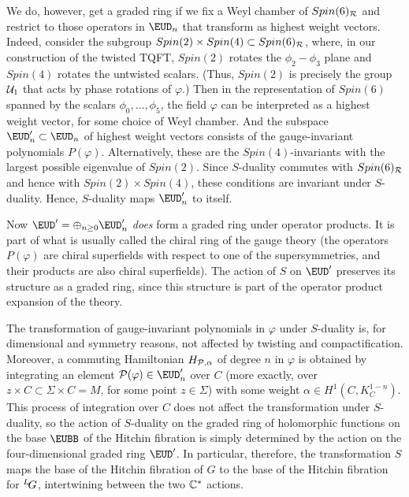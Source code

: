 We do, however, get a graded ring if we fix a Weyl chamber of
$Spin(6)_{\cal R}$  and restrict to those operators in ${\EUD}_n$
that transform as highest weight vectors. Indeed, consider the
subgroup $Spin(2)\times Spin(4)\subset Spin(6)_{{\cal R}}$, where,
in our construction of the twisted TQFT,  $Spin(2)$ rotates the
$\phi_2-\phi_3$ plane and $Spin(4)$ rotates the untwisted scalars.
(Thus, $Spin(2)$ is precisely the group ${\cal U}_1$ that acts by
phase rotations of $\varphi$.)   Then in the representation of
$Spin(6)$ spanned by the scalars $\phi_0,\dots,\phi_5$, the field
$\varphi$ can be interpreted as a highest weight vector, for some
choice of Weyl chamber. And the subspace ${\EUD}'_n\subset
{\EUD}_n$ of highest weight vectors consists of the
gauge-invariant polynomials $P(\varphi)$. Alternatively, these are
the $Spin(4)$-invariants with the largest possible eigenvalue of
$Spin(2)$.  Since $S$-duality commutes with $Spin(6)_{\cal R}$ and
hence with $Spin(2)\times Spin(4)$, these conditions are invariant
under $S$-duality.   Hence, $S$-duality maps ${\EUD}'_n$ to
itself.

Now ${\EUD}'=\oplus_{n\geq 0}{\EUD}'_n$ {\it does} form a graded
ring under operator products.  It is part of what is usually
called the chiral ring of the gauge theory (the operators
$P(\varphi)$ are chiral superfields with respect to one of the
supersymmetries, and their products are also chiral superfields).
The action of $S$ on ${\EUD}'$ preserves its structure as a graded
ring, since this structure is part of the operator product
expansion of the theory.

 The transformation of gauge-invariant polynomials in $\varphi$
under $S$-duality is, for dimensional and symmetry reasons, not
affected by twisting and compactification.  Moreover, a commuting
Hamiltonian $H_{{\cal P},\alpha}$ of degree $n$ in $\varphi$ is
obtained by integrating an element ${\cal P}(\varphi)\in\EUD'_n$
over $C$ (more exactly, over $z\times C\subset \Sigma\times C=M$,
for some point $z\in\Sigma$) with some weight $\alpha\in
H^1(C,K_C^{1-n})$. This process of integration over $C$ does not
affect the transformation under $S$-duality, so the action of
$S$-duality on the graded ring of holomorphic functions on the
base ${\EUBB}$ of the Hitchin fibration is simply determined by
the action on the four-dimensional graded ring $\EUD'$. In
particular, therefore, the transformation $S$ maps the base of the
Hitchin fibration of $G$ to the base of the Hitchin fibration for
$^L\negthinspace G$, intertwining between the two $\Bbb{C}^*$
actions.

